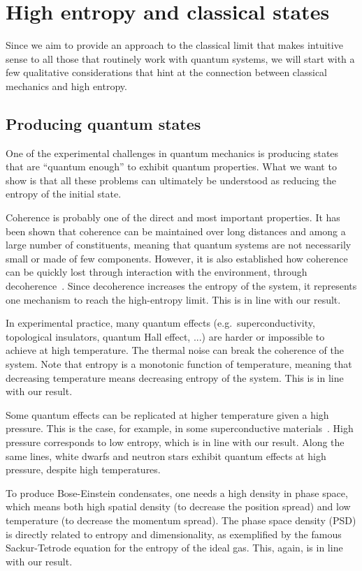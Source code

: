 \documentclass{article}
\begin{document}
\section{High entropy and classical states}

Since we aim to provide an approach to the classical limit that makes intuitive sense to all those that routinely work with quantum systems, we will start with a few qualitative considerations that hint at the connection between classical mechanics and high entropy.

\subsection{Producing quantum states}

One of the experimental challenges in quantum mechanics is producing states that are ``quantum enough'' to exhibit quantum properties. What we want to show is that all these problems can ultimately be understood as reducing the entropy of the initial state.

Coherence is probably one of the direct and most important properties. It has been shown that coherence can be maintained over long distances and among a large number of constituents, meaning that quantum systems are not necessarily small or made of few components. However, it is also established how coherence can be quickly lost through interaction with the environment, through decoherence~\cite{RevModPhys.75.715, SCHLOSSHAUER20191}. Since decoherence increases the entropy of the system, it represents one mechanism to reach the high-entropy limit. This is in line with our result.

In experimental practice, many quantum effects (e.g.~superconductivity, topological insulators, quantum Hall effect, ...) are harder or impossible to achieve at high temperature. The thermal noise can break the coherence of the system. Note that entropy is a monotonic function of temperature, meaning that decreasing temperature means decreasing entropy of the system. This is in line with our result.

Some quantum effects can be replicated at higher temperature given a high pressure. This is the case, for example, in some superconductive materials~\cite{Drozdov:2015}. High pressure corresponds to low entropy, which is in line with our result. Along the same lines, white dwarfs and neutron stars exhibit quantum effects at high pressure, despite high temperatures.

To produce Bose-Einstein condensates, one needs a high density in phase space, which means both high spatial density (to decrease the position spread) and low temperature (to decrease the momentum spread). The phase space density (PSD) is directly related to entropy and dimensionality, as exemplified by the famous Sackur-Tetrode equation for the entropy of the ideal gas. This, again, is in line with our result.
\end{document}
